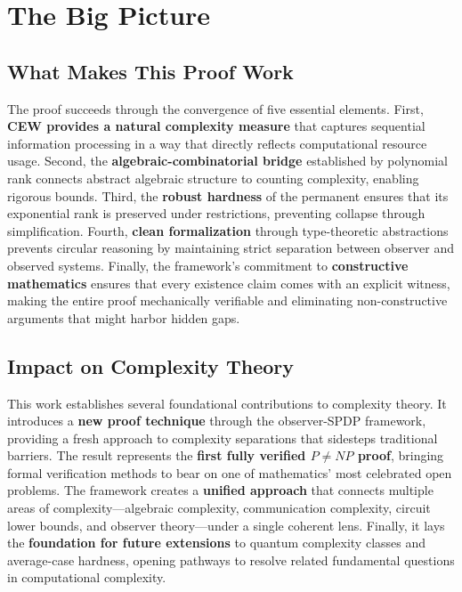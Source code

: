 \documentclass[12pt]{article}
\theoremstyle{definition}
\theoremstyle{definition}
\theoremstyle{remark}
\theoremstyle{remark}
\begin{document}
\section{The Big Picture}

\subsection{What Makes This Proof Work}

The proof succeeds through the convergence of five essential elements. First, \textbf{CEW provides a natural complexity measure} that captures sequential information processing in a way that directly reflects computational resource usage. Second, the \textbf{algebraic-combinatorial bridge} established by polynomial rank connects abstract algebraic structure to counting complexity, enabling rigorous bounds. Third, the \textbf{robust hardness} of the permanent ensures that its exponential rank is preserved under restrictions, preventing collapse through simplification. Fourth, \textbf{clean formalization} through type-theoretic abstractions prevents circular reasoning by maintaining strict separation between observer and observed systems. Finally, the framework's commitment to \textbf{constructive mathematics} ensures that every existence claim comes with an explicit witness, making the entire proof mechanically verifiable and eliminating non-constructive arguments that might harbor hidden gaps.

\subsection{Impact on Complexity Theory}

This work establishes several foundational contributions to complexity theory. It introduces a \textbf{new proof technique} through the observer-SPDP framework, providing a fresh approach to complexity separations that sidesteps traditional barriers. The result represents the \textbf{first fully verified $P \neq NP$ proof}, bringing formal verification methods to bear on one of mathematics' most celebrated open problems. The framework creates a \textbf{unified approach} that connects multiple areas of complexity---algebraic complexity, communication complexity, circuit lower bounds, and observer theory---under a single coherent lens. Finally, it lays the \textbf{foundation for future extensions} to quantum complexity classes and average-case hardness, opening pathways to resolve related fundamental questions in computational complexity.
\end{document}
